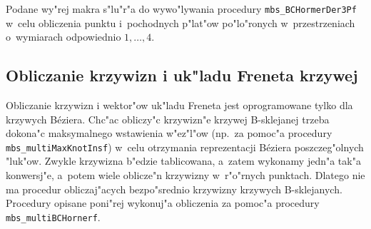 \vspace{\bigskipamount}
Podane wy"rej makra s"lu"r"a do wywo"lywania procedury
\texttt{mbs\_BCHormerDer3Pf} w~celu obliczenia punktu i~pochodnych p"lat"ow
po"lo"ronych w~przestrzeniach o~wymiarach odpowiednio $1,\ldots,4$.


\newpage
\subsection{Obliczanie krzywizn i uk"ladu Freneta krzywej}

Obliczanie krzywizn i wektor"ow uk"ladu Freneta jest oprogramowane tylko dla
krzywych B\'{e}ziera. Chc"ac obliczy"c krzywizn"e krzywej B-sklejanej trzeba
dokona"c maksymalnego wstawienia w"ez"l"ow (np.\ za pomoc"a procedury
\texttt{mbs\_multiMaxKnotInsf}) w~celu otrzymania reprezentacji B\'{e}ziera
poszczeg"olnych "luk"ow. Zwykle krzy\-wiz\-na b"edzie tablicowana, a~zatem
wykonamy jedn"a tak"a konwersj"e, a~potem wiele oblicze"n krzywizny
w~r"o"rnych punktach. Dlatego nie ma procedur obliczaj"acych bezpo"srednio
krzywizny krzywych B-sklejanych. Procedury opisane poni"rej wykonuj"a
obliczenia za pomoc"a procedury \texttt{mbs\_multiBCHornerf}.

